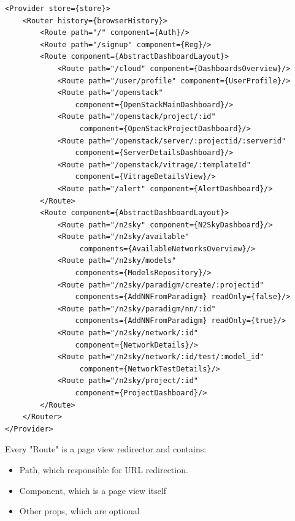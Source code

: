 \begin{lstlisting}
<Provider store={store}>
	<Router history={browserHistory}>
		<Route path="/" component={Auth}/>
		<Route path="/signup" component={Reg}/>
		<Route component={AbstractDashboardLayout}>
			<Route path="/cloud" component={DashboardsOverview}/>
			<Route path="/user/profile" component={UserProfile}/>
			<Route path="/openstack" 
				component={OpenStackMainDashboard}/>
			<Route path="/openstack/project/:id"
				 component={OpenStackProjectDashboard}/>
			<Route path="/openstack/server/:projectid/:serverid" 
				component={ServerDetailsDashboard}/>
			<Route path="/openstack/vitrage/:templateId" 
				component={VitrageDetailsView}/>
			<Route path="/alert" component={AlertDashboard}/>
		</Route>
		<Route component={AbstractDashboardLayout}>
			<Route path="/n2sky" component={N2SkyDashboard}/>
			<Route path="/n2sky/available"
				 components={AvailableNetworksOverview}/>
			<Route path="/n2sky/models" 
				components={ModelsRepository}/>
			<Route path="/n2sky/paradigm/create/:projectid" 
				components={AddNNFromParadigm} readOnly={false}/>
			<Route path="/n2sky/paradigm/nn/:id" 
				components={AddNNFromParadigm} readOnly={true}/>
			<Route path="/n2sky/network/:id" 
				component={NetworkDetails}/>
			<Route path="/n2sky/network/:id/test/:model_id"
				 component={NetworkTestDetails}/>
			<Route path="/n2sky/project/:id"
				component={ProjectDashboard}/>
		</Route>
	</Router>
</Provider>
\end{lstlisting}

Every "Route" is a page view redirector and contains:
\begin{itemize}
\item Path, which responsible for URL redirection.
\item Component, which is a page view itself
\item Other props, which are optional
\end{itemize}


